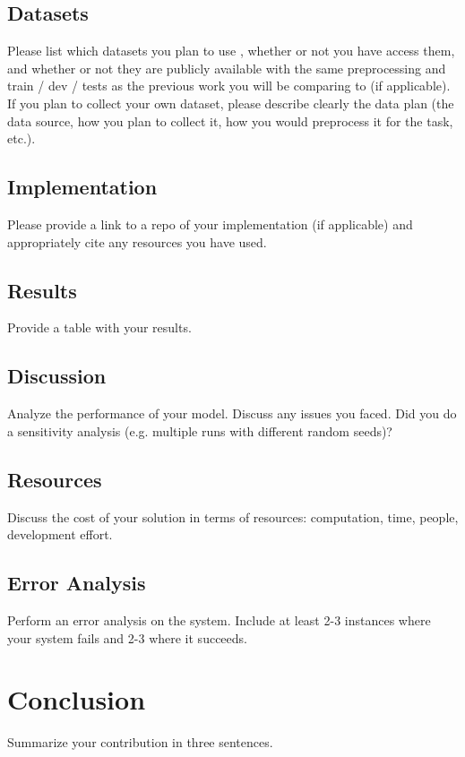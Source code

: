 \documentclass[11pt,a4paper]{article}
\begin{document}
\subsection{Datasets}
Please list which datasets you plan to use , whether or not you have access them, and whether or not they are publicly available with the same preprocessing and train / dev / tests as the previous work you will be comparing to (if applicable). If you plan to collect your own dataset, please describe clearly the data plan (the data source, how you plan to collect it, how you would preprocess it for the task, etc.).

\subsection{Implementation} 
Please provide a link to a repo of your implementation (if applicable) and appropriately cite any resources you have used.

\subsection{Results}
Provide a table with your results.

\subsection{Discussion}
Analyze the performance of your model. Discuss any issues you faced. Did you do a sensitivity analysis (e.g. multiple runs with different random seeds)?

\subsection{Resources}
Discuss the cost of your solution in terms of resources: computation, time, people, development effort.


\subsection{Error Analysis}
Perform an error analysis on the system. Include at least 2-3 instances where your system fails and 2-3 where it succeeds.


\section{Conclusion}
Summarize your contribution in three sentences.

\end{document}
